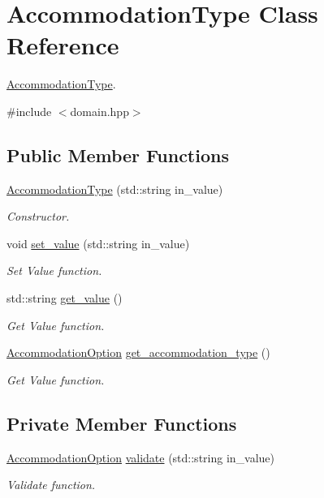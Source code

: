 \hypertarget{classAccommodationType}{}\section{Accommodation\+Type Class Reference}
\label{classAccommodationType}


\hyperlink{classAccommodationType}{Accommodation\+Type}.  




{\ttfamily \#include $<$domain.\+hpp$>$}

\subsection*{Public Member Functions}
\begin{DoxyCompactItemize}
\item 
\hyperlink{classAccommodationType_a18d81f6eae122bad2e50f620dae57fed}{Accommodation\+Type} (std\+::string in\+\_\+value)
\begin{DoxyCompactList}\small\item\em Constructor. \end{DoxyCompactList}\item 
void \hyperlink{classAccommodationType_aa7beb5f0c3c7a48bddcbf1781af21dfb}{set\+\_\+value} (std\+::string in\+\_\+value)
\begin{DoxyCompactList}\small\item\em Set Value function. \end{DoxyCompactList}\item 
std\+::string \hyperlink{classAccommodationType_a5bdf50469bcf782d670cee14454317e4}{get\+\_\+value} ()
\begin{DoxyCompactList}\small\item\em Get Value function. \end{DoxyCompactList}\item 
\hyperlink{domain_8hpp_a431fd866a01d44cdd7f9dc9ce476d1c2}{Accommodation\+Option} \hyperlink{classAccommodationType_a11a6281b14ee26b7cdeb5431cd708550}{get\+\_\+accommodation\+\_\+type} ()
\begin{DoxyCompactList}\small\item\em Get Value function. \end{DoxyCompactList}\end{DoxyCompactItemize}
\subsection*{Private Member Functions}
\begin{DoxyCompactItemize}
\item 
\hyperlink{domain_8hpp_a431fd866a01d44cdd7f9dc9ce476d1c2}{Accommodation\+Option} \hyperlink{classAccommodationType_a9f5313a68358697f95895d0b02fa5771}{validate} (std\+::string in\+\_\+value)
\begin{DoxyCompactList}\small\item\em Validate function. \end{DoxyCompactList}\end{DoxyCompactItemize}
